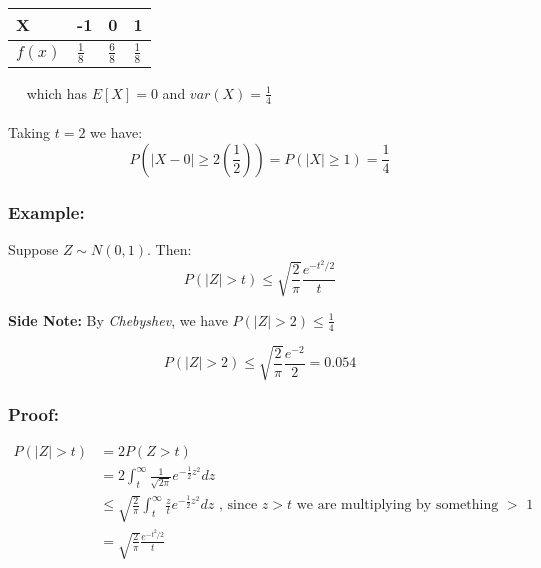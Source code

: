 \documentclass{article}
\begin{document}
    
\begin{tabular}{|l|l|l|l|}
\hline
X      & -1            & 0             & 1             \\ \hline
$f(x)$ & $\frac{1}{8}$ & $\frac{6}{8}$ & $\frac{1}{8}$ \\ \hline
\end{tabular} $\quad$ which has $E[X] = 0$ and $var(X) = \frac{1}{4}$
\\~\\
Taking $t=2$ we have:
\begin{equation*}
    P\left(|X-0| \geq 2 \left(\frac{1}{2}\right)\right) = P(|X|\geq 1) = \frac{1}{4}
\end{equation*}


\subsubsection*{Example:}

Suppose $Z \sim N(0,1)$. Then:
\begin{equation*}
    P(|Z|>t) \leq \sqrt{\frac{2}{\pi}} \frac{e^{-t^2/2}}{t}
\end{equation*}

\noindent \textbf{Side Note:} By \textit{Chebyshev}, we have $P(|Z|>2) \leq \frac{1}{4}$

\begin{equation*}
    P(|Z|>2) \leq \sqrt{\frac{2}{\pi}} \frac{e^{-2}}{2} = 0.054
\end{equation*}

\subsubsection*{Proof:}

\begin{equation*}
    \begin{split}
        P(|Z|>t) &= 2 P(Z > t)\\
                &= 2 \int_{t}^\infty \frac{1}{\sqrt{2\pi}} e^{-\frac{1}{2}z^2}dz\\
                &\leq \sqrt{\frac{2}{\pi}} \int_t^\infty \frac{z}{t} e^{-\frac{1}{2}z^2}dz \text{ , since $z > t$ we are multiplying by something $>$ 1}\\
                &= \sqrt{\frac{2}{\pi}} \frac{e^{-t^2/2}}{t}
    \end{split}
\end{equation*}
    
   
\end{document}
